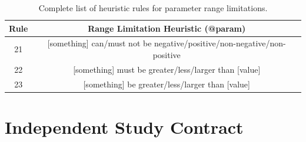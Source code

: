 \begin{table}[h]
	\centering
	\begin{tabular}{|c|c|}
		\hline
		\textbf{Rule} & \textbf{Range Limitation Heuristic (@param)} \\ \hline
		21 & [something] can/must {not} be negative/positive/non-negative/non-positive \\ \hline
		22 & [something] must be greater/less/larger than [value] \\ \hline
		23 & [something] be greater/less/larger than [value] \\ \hline
	\end{tabular}
	\caption{Complete list of heuristic rules for parameter range limitations.}
	\label{tab:complete-heuristics-range-limit-param}
\end{table}

\section{Independent Study Contract}

